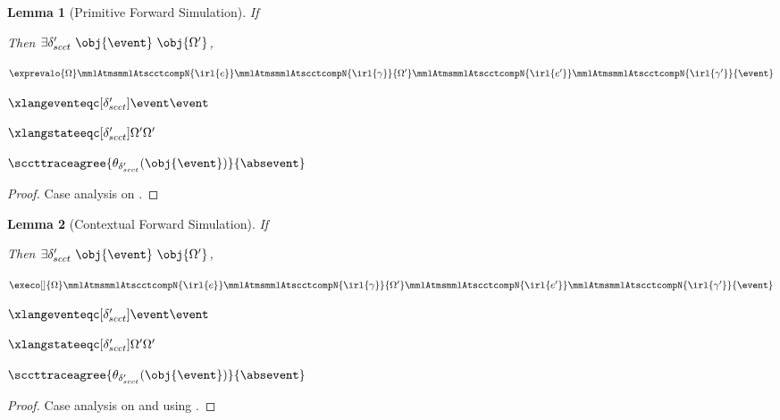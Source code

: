 \documentclass[a4paper,names,dvipsnames]{article}
\newtheorem{lemma}{Lemma}
\begin{document}
\begin{lemma}[Primitive Forward Simulation]\label{lem:prim:forwardsim:scct}
  If
  Then $\exists \delta_{scct}'\ \obj{\event}\ \obj{\Omega'}$,
  \begin{goals}
    \item $\exprevalo{\Omega}\mmlAtmsmmlAtscctcompN{\irl{e}}\mmlAtmsmmlAtscctcompN{\irl{\gamma}}{\Omega'}\mmlAtmsmmlAtscctcompN{\irl{e'}}\mmlAtmsmmlAtscctcompN{\irl{\gamma'}}{\event}$
    \item $\xlangeventeqc[\delta_{scct}']{\event}{\event}$
    \item $\xlangstateeqc[\delta_{scct}']{\Omega'}{\Omega'}$
    \item $\sccttraceagree{\theta_{\delta_{scct}'}(\obj{\event})}{\absevent}$
  \end{goals}
\end{lemma}
\begin{proof}
  Case analysis on .
\end{proof}

\begin{lemma}[Contextual Forward Simulation]\label{lem:ctx:forwardsim:scct}
  If
  Then $\exists \delta_{scct}'\ \obj{\event}\ \obj{\Omega'}$,
  \begin{goals}
    \item $\execo[]{\Omega}\mmlAtmsmmlAtscctcompN{\irl{e}}\mmlAtmsmmlAtscctcompN{\irl{\gamma}}{\Omega'}\mmlAtmsmmlAtscctcompN{\irl{e'}}\mmlAtmsmmlAtscctcompN{\irl{\gamma'}}{\event}$
    \item $\xlangeventeqc[\delta_{scct}']{\event}{\event}$
    \item $\xlangstateeqc[\delta_{scct}']{\Omega'}{\Omega'}$
    \item $\sccttraceagree{\theta_{\delta_{scct}'}(\obj{\event})}{\absevent}$
  \end{goals}
\end{lemma}
\begin{proof}
  Case analysis on  and using .
\end{proof}
\end{document}
